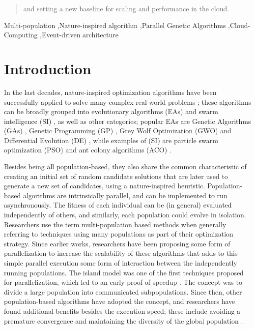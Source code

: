 \documentclass[review]{elsarticle}
\begin{document}
\begin{frontmatter}
\begin{abstract}
and setting a new baseline for scaling and
performance in the cloud.
\end{abstract}

\begin{keyword}
Multi-population \sep Nature-inspired algorithm \sep Parallel Genetic Algorithms \sep Cloud-Computing
\sep Event-driven architecture 
\end{keyword}

\end{frontmatter}

\linenumbers

\section{Introduction}

In the last decades, nature-inspired optimization algorithms have been successfully
applied to solve many complex real-world problems
\cite{yang2014nature}; these algorithms can be broadly grouped into evolutionary algorithms (EAs)
\cite{back1996evolutionary} and swarm intelligence (SI)
\cite{kennedy2006swarm}, as well as other categories; popular EAs
are Genetic Algorithms (GAs) \cite{holland1992adaptation,eiben2003genetic}, 
Genetic Programming (GP) \cite{back1996evolutionary}, Grey Wolf Optimization
(GWO) \cite{mirjalili2014grey} and Differential Evolution (DE) \cite{karabouga2004simple},
while examples of (SI) \cite{kennedy2006swarm} are particle swarm
optimization (PSO) \cite{clerc2010particle} and ant colony algorithms (ACO) \cite{dorigo1999ant}.

Besides being all population-based, they also share the common characteristic
of creating an initial set of random candidate solutions that are later used to
generate a new set of candidates, using a nature-inspired heuristic.
Population-based algorithms are intrinsically parallel, and can be implemented to run asynchronously.
The fitness of each individual can be (in general) evaluated independently of 
others, and similarly, each population could evolve in isolation. Researchers use the term
multi-population based methods when generally referring to techniques using
many populations as part of their optimization strategy. 
Since 
earlier works, researchers have been proposing some form of parallelization
\cite{muhlenbein1988evolution} to increase the scalability of these
algorithms that adds to this simple parallel execution some form of
interaction between the independently running populations.
The island model was one of the first techniques proposed for parallelization,
which led to an early proof of speedup   \cite{gorges1990explicit,grosso1985computer}. 
The concept was to divide a large population into communicated subpopulations. 
Since then, other population-based algorithms have adopted the concept, 
and researchers have found additional benefits
besides the execution speed; these include avoiding a premature convergence and
maintaining the diversity of the global population \cite{li2015multi}. 
\end{document}
